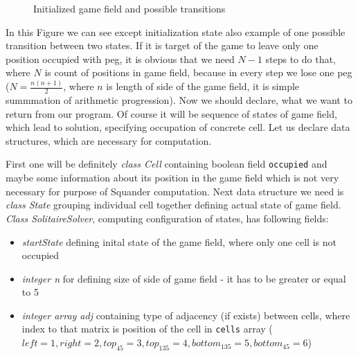 \documentclass[11pt,twoside,a4paper]{book}
\begin{document}
\begin{figure}[ht]
\begin{center}
\begin{tikzpicture}[>=stealth]



\end{tikzpicture}

\end{center}
\caption{Initialized game field and possible transitions}
\label{fig:initGF}
\end{figure}

In this Figure we can see except initialization state also example of one
possible transition between two states. If it is target of the game to leave
only one position occupied with peg, it is obvious that we need $N - 1$ steps to
do that, where $N$ is count of positions in game field, because in every step we
lose one peg ($N = \frac{n(n+1)}{2}$, where $n$ is length of side of the game
field, it is simple summmation of arithmetic progression). Now we should
declare, what we want to return from our program. Of course it will be sequence
of states of game field, which lead to solution, specifying occupation of
concrete cell. Let us declare data structures, which are necessary for computation.

First one will be definitely \textit{class Cell} containing boolean field
\verb|occupied| and maybe some information about its position in the game field
which is not very necessary for purpose of Squander computation. Next data
structure we need is \textit{class State} grouping individual cell together
defining actual state of game field. \textit{Class SolitaireSolver}, computing
configuration of states, has following fields:
\newpage
\begin{itemize}
  \item \textit{startState} defining inital state of the game field, where only
  one cell is not occupied
  \item \textit{integer n} for defining size of side of game field - it has to
  be greater or equal to 5
  \item \textit{integer array adj} containing type of adjacency (if exists)
  between cells, where index to that matrix is position of the cell in
  \verb|cells| array ($left=1, right=2, top_{45}=3, top_{135}=4, bottom_{135}=5,
  bottom_{45}=6$)
\end{itemize}
\end{document}
